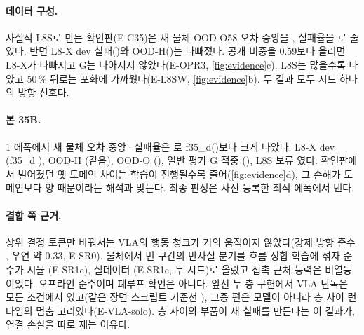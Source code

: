 \paragraph{데이터 구성.} 사실적 L8S로 만든 확인판(E-C35)은 새 물체 OOD-O58 오차 중앙을 , 실패율을 로 줄였다. 반면 L8-X dev 실패()와 OOD-H()는 나빠졌다. 공개 비중을 0.59보다 올리면 L8-X가 나빠지고 G는 나아지지 않았다(E-OPR3, \cref{fig:evidence}c). L8S는 많을수록 나았고 50\,\% 뒤로는 포화에 가까웠다(E-L8SW, \cref{fig:evidence}b). 두 결과 모두 시드 하나의 방향 신호다.

\paragraph{본 35B.} 1 에폭에서 새 물체 오차 중앙·실패율은 로 f35\_d()보다 크게 나았다. L8-X dev (f35\_d ), OOD-H (같음), OOD-O (), 일반 평가 G 적중 (), L8S 보류 였다. 확인판에서 벌어졌던 옛 도메인 차이는 학습이 진행될수록 줄어(\cref{fig:evidence}d), 그 손해가 도메인보다 양 때문이라는 해석과 맞는다. 최종 판정은 사전 등록한 최적 에폭에서 낸다.

\paragraph{결합 쪽 근거.} 상위 결정 토큰만 바꿔서는 VLA의 행동 청크가 거의 움직이지 않았다(강제 방향 준수 , 우연 약 0.33, E-SR0). 물체에서 먼 구간의 반사실 분기를 흐름 정합 학습에 섞자 준수가 시뮬 (E-SR1c), 실데이터 (E-SR1e, 두 시드)로 올랐고 접촉 근처 능력은 비열등이었다. 오프라인 준수이며 폐루프 확인은 아니다. 앞선 두 층 구현에서 VLA 단독은 모든 조건에서 였고(같은 장면 스크립트 기준선 ), 그중 편은 모델이 아니라 층 사이 런타임의 멈춤 고리였다(E-VLA-solo). 층 사이의 부품이 새 실패를 만든다는 이 결과가, 연결 손실을 따로 재는 이유다.

